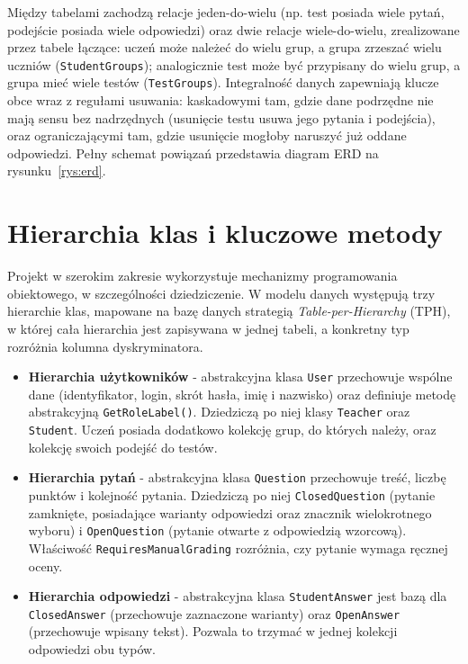 Między tabelami zachodzą relacje jeden-do-wielu (np. test posiada wiele pytań, podejście posiada
wiele odpowiedzi) oraz dwie relacje wiele-do-wielu, zrealizowane przez tabele łączące: uczeń może
należeć do wielu grup, a grupa zrzeszać wielu uczniów (\texttt{StudentGroups}); analogicznie test
może być przypisany do wielu grup, a grupa mieć wiele testów (\texttt{TestGroups}). Integralność
danych zapewniają klucze obce wraz z regułami usuwania: kaskadowymi tam, gdzie dane podrzędne nie
mają sensu bez nadrzędnych (usunięcie testu usuwa jego pytania i podejścia), oraz ograniczającymi
tam, gdzie usunięcie mogłoby naruszyć już oddane odpowiedzi. Pełny schemat powiązań przedstawia
diagram ERD na rysunku~\ref{rys:erd}.


\section{Hierarchia klas i kluczowe metody}
\label{sec:hierarchiaKlas}

Projekt w szerokim zakresie wykorzystuje mechanizmy programowania obiektowego, w szczególności
dziedziczenie. W modelu danych występują trzy hierarchie klas, mapowane na bazę danych strategią
\emph{Table-per-Hierarchy} (TPH), w której cała hierarchia jest zapisywana w jednej tabeli,
a konkretny typ rozróżnia kolumna dyskryminatora.

\begin{itemize}
  \item \textbf{Hierarchia użytkowników} - abstrakcyjna klasa \texttt{User} przechowuje wspólne
        dane (identyfikator, login, skrót hasła, imię i nazwisko) oraz definiuje metodę abstrakcyjną
        \texttt{GetRoleLabel()}. Dziedziczą po niej klasy \texttt{Teacher} oraz \texttt{Student}.
        Uczeń posiada dodatkowo kolekcję grup, do których należy, oraz kolekcję swoich podejść do
        testów.

  \item \textbf{Hierarchia pytań} - abstrakcyjna klasa \texttt{Question} przechowuje treść, liczbę
        punktów i kolejność pytania. Dziedziczą po niej \texttt{ClosedQuestion} (pytanie zamknięte,
        posiadające warianty odpowiedzi oraz znacznik wielokrotnego wyboru) i \texttt{OpenQuestion}
        (pytanie otwarte z odpowiedzią wzorcową). Właściwość \texttt{RequiresManualGrading}
        rozróżnia, czy pytanie wymaga ręcznej oceny.

  \item \textbf{Hierarchia odpowiedzi} - abstrakcyjna klasa \texttt{StudentAnswer} jest bazą dla
        \texttt{ClosedAnswer} (przechowuje zaznaczone warianty) oraz \texttt{OpenAnswer}
        (przechowuje wpisany tekst). Pozwala to trzymać w jednej kolekcji odpowiedzi obu typów.
\end{itemize}

